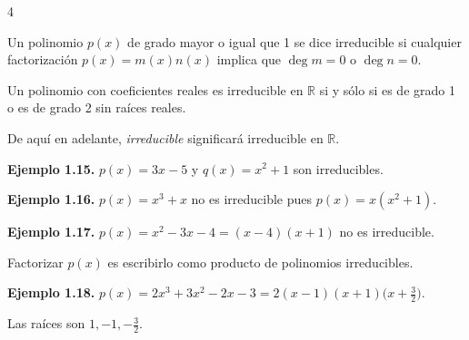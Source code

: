 \documentclass[landscape]{article}
\begin{document}
\begin{landscape}
\begin{multicols}{4}
\begin{tcolorbox}[colback=blue!5!white,colframe=blue!75!black,title=\textbf{Definición (Polinomio irreducible)}]
Un polinomio $p(x)$ de grado mayor o igual que 1 se dice irreducible si cualquier factorización 
$p(x) = m(x)n(x)$ implica que $\deg m = 0$ o $\deg n = 0$.
\end{tcolorbox}

Un polinomio con coeficientes reales es irreducible en $\mathbb{R}$ si y sólo si es de grado 1 o es de grado 2 sin raíces reales.

\begin{observacion}[1.6] De aquí en adelante, \emph{irreducible} significará irreducible en $\mathbb{R}$. \end{observacion}

\noindent\textbf{Ejemplo 1.15.} $p(x) = 3x - 5$ y $q(x) = x^2 + 1$ son irreducibles.

\noindent\textbf{Ejemplo 1.16.} $p(x) = x^3 + x$ no es irreducible pues $p(x)=x(x^2+1)$.

\noindent\textbf{Ejemplo 1.17.} $p(x) = x^2 - 3x - 4 = (x-4)(x+1)$ no es irreducible.

\begin{tcolorbox}[colback=blue!5!white,colframe=blue!75!black,title=\textbf{Definición (Factorización de un polinomio)}]
Factorizar $p(x)$ es escribirlo como producto de polinomios irreducibles.
\end{tcolorbox}

\noindent\textbf{Ejemplo 1.18.} 
$p(x) = 2x^3 + 3x^2 - 2x - 3 = 2(x-1)(x+1)\bigl(x+\tfrac32\bigr)$.

\begin{observacion}[1.7] Las raíces son $1,-1,-\tfrac32$. \end{observacion}

\end{multicols}
\end{landscape}
\end{document}
